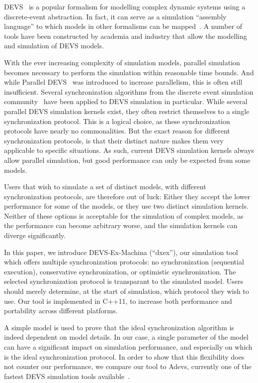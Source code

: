 \textsf{DEVS}~\cite{ClassicDEVS} is a popular formalism for modelling complex dynamic systems using a discrete-event abstraction.
In fact, it can serve as a simulation ``assembly language'' to which models in other formalisms can be mapped~\cite{DEVSbase}.
A number of tools have been constructed by academia and industry that allow the modelling and simulation of \textsf{DEVS} models.

With the ever increasing complexity of simulation models, parallel simulation becomes necessary to perform the simulation within reasonable time bounds.
And while \textsf{Parallel DEVS}~\cite{ParallelDEVS} was introduced to increase parallelism, this is often still insufficient.
Several synchronization algorithms from the discrete event simulation community~\cite{FujimotoBook} have been applied to \textsf{DEVS} simulation in particular.
While several parallel \textsf{DEVS} simulation kernels exist, they often restrict themselves to a single synchronization protocol.
This is a logical choice, as these synchronization protocols have nearly no commonalities.
But the exact reason for different synchronization protocols, is that their distinct nature makes them very applicable to specific situations.
As such, current \textsf{DEVS} simulation kernels always allow parallel simulation, but good performance can only be expected from some models.

Users that wish to simulate a set of distinct models, with different synchronization protocols, are therefore out of luck:
Either they accept the lower performance for some of the models, or they use two distinct simulation kernels.
Neither of these options is acceptable for the simulation of complex models, as the performance can become arbitrary worse, and the simulation kernels can diverge significantly.

In this paper, we introduce DEVS-Ex-Machina (``dxex''), our simulation tool which offers multiple synchronization protocols: no synchronization (sequential execution), conservative synchronization, or optimistic synchronization.
The selected synchronization protocol is transparant to the simulated model.
Users should merely determine, at the start of simulation, which protocol they wish to use.
Our tool is implemented in C++11, to increase both performance and portability across different platforms.

A simple model is used to prove that the ideal synchronization algorithm is indeed dependent on model details.
In our case, a single parameter of the model can have a significant impact on simulation performance, and especially on which is the ideal synchronization protocol.
In order to show that this flexibility does not counter our performance, we compare our tool to Adevs, currently one of the fastest \textsf{DEVS} simulation tools available~\cite{PythonPDEVS,DEVSSurvey}.

